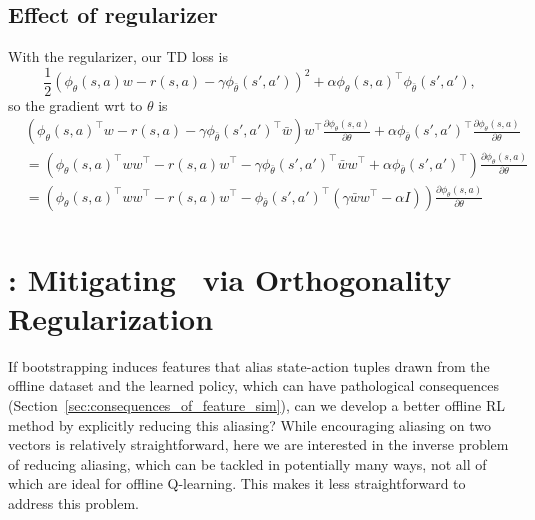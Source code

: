 \subsection{Effect of regularizer}
With the regularizer, our TD loss is
\[ \frac{1}{2}\left(\phi_\theta(s, a)w - r(s, a) - \gamma\phi_{\bar{\theta}}(s', a')\right)^2 + \alpha \phi_\theta(s, a)^\top \phi_{\bar{\theta}}(s', a'),\]
so the gradient wrt to $\theta$ is
\begin{align*}
  &\left(\phi_\theta(s, a)^\top w - r(s, a) - \gamma\phi_{\bar{\theta}}(s', a')^\top \bar{w} \right)w^\top\frac{\partial \phi_\theta(s, a)}{\partial \theta} + \alpha \phi_{\bar{\theta}}(s', a')^\top\frac{\partial \phi_\theta(s, a)}{\partial \theta}\\
  &=\left(\phi_\theta(s, a)^\top ww^\top - r(s, a)w^\top - \gamma\phi_{\bar{\theta}}(s', a')^\top \bar{w}w^\top + \alpha\phi_{\bar{\theta}}(s', a')^\top \right)\frac{\partial \phi_\theta(s, a)}{\partial \theta} \\ 
  &=\left(\phi_\theta(s, a)^\top ww^\top - r(s, a)w^\top - \phi_{\bar{\theta}}(s', a')^\top \left(\gamma\bar{w}w^\top - \alpha I \right)\right)\frac{\partial \phi_\theta(s, a)}{\partial \theta} \\ 
\end{align*}
\fi


\iffalse
\section{\methodname: Mitigating \AliasingProblemName\ via Orthogonality Regularization}
\label{sec:method}


If bootstrapping induces features that alias state-action tuples drawn from the offline dataset and the learned policy, which can have pathological consequences (Section~\ref{sec:consequences_of_feature_sim}), can we develop a better offline RL method by explicitly reducing this aliasing? While encouraging aliasing on two vectors is relatively straightforward, here we are interested in the inverse problem of reducing aliasing, which can be tackled in potentially many ways, not all of which are ideal for offline Q-learning. This makes it less straightforward to address this problem.

